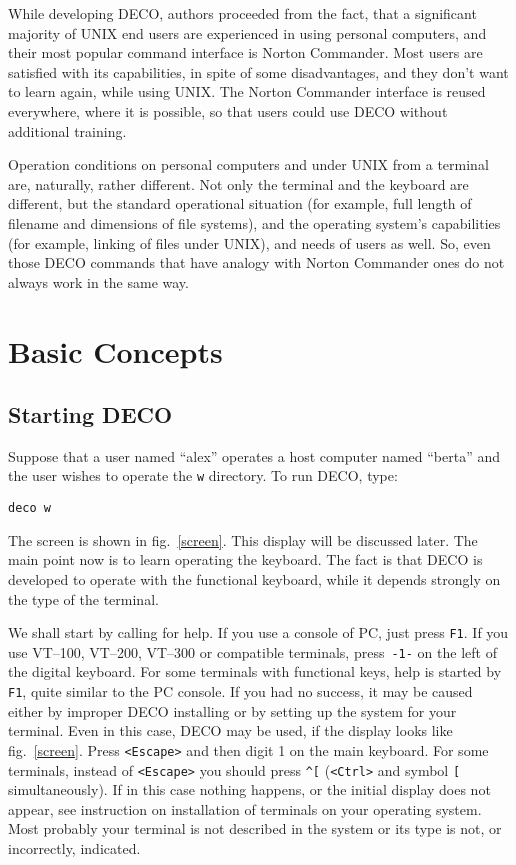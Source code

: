 While developing DECO, authors proceeded from the fact, that a significant
majority of UNIX end users are experienced in using personal computers,
and their most popular command interface
is Norton Commander. Most users are satisfied
with its capabilities, in spite of some disadvantages, and they don't
want to learn again, while using UNIX. The Norton 
Commander interface is reused everywhere, where it is 
possible, so that users could use DECO without additional training.

Operation conditions on personal computers and under UNIX from
a terminal are, naturally, rather different. Not only the terminal
and the keyboard are different, but the standard operational situation (for
example, full length of filename and dimensions of file systems), and
the operating system's capabilities (for example, linking of files
under UNIX), and needs of users as well. So, even those DECO commands that
have analogy with Norton Commander ones do not always work in the same way.

\section{Basic Concepts}

\subsection{Starting DECO}

Suppose that a user named ``alex'' operates a host
computer named ``berta'' and the user wishes to operate
the {\tt w} directory. To run DECO, type:

\begin{source}
\begin{verbatim}
deco w
\end{verbatim}
\end{source}

The screen is shown in fig.~\ref{screen}.
This display will be discussed later. The main point 
now is to learn operating the keyboard. The fact is that 
DECO is developed to operate with the functional 
keyboard, while it depends strongly on the type of the 
terminal.

We shall start by calling for help. If you use a console of PC, just press
{\tt F1}. If you use VT--100, VT--200, VT--300 or compatible terminals,
press~{\tt -1-} on the left of the digital keyboard. For some terminals
with functional keys, help is started by {\tt F1}, quite similar to
the PC console. If you had no success, it may be caused either by
improper DECO installing or by setting up the system
for your terminal. Even in this case, DECO may be 
used, if the display looks like fig.~\ref{screen}. Press {\tt <Escape>} and
then digit 1 on the main keyboard. For some terminals, instead of
{\tt <Escape>} you should press {\tt \^{}[} ({\tt <Ctrl>} and
symbol {\tt [} simultaneously). If in this case
nothing happens, or the initial display does not appear,
see instruction on installation of terminals on your operating system.
Most probably your terminal is not described in the system or its type is
not, or incorrectly, indicated.

